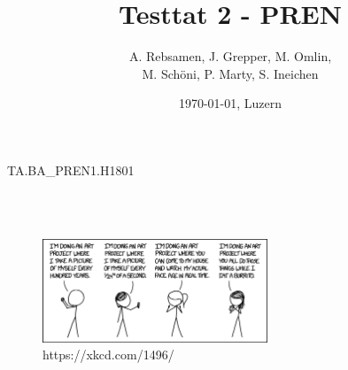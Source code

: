 \documentclass[11pt]{scrartcl}
\title{Testtat 2 - PREN}
\author{A. Rebsamen, J. Grepper, M. Omlin, \\ M. Schöni, P. Marty, S. Ineichen}
\date{\today{}, Luzern}
\begin{document}
        \begin{titlingpage}
            \begin{center}
                \begin{Huge} %
                    TA.BA{\_}PREN1.H1801 \\
                    \textbf{\thetitle} \\
                \end{Huge}
                \vspace{0.5cm}
                \begin{huge} %
                    \theauthor \\
                \end{huge}
                \vspace{0.5cm}
                \vspace{1cm}
                \begin{figure}[H] %
                    \centering
                    \includegraphics[width=0.6\textwidth]{images/comic.png}
                    \caption {https://xkcd.com/1496/}
                \end{figure}
                \vspace{0.5cm}
                \begin{huge} %
                    \thedate
                \end{huge}
            \end{center}
        \end{titlingpage}

        \tableofcontents
        \clearpage


\end{document}
